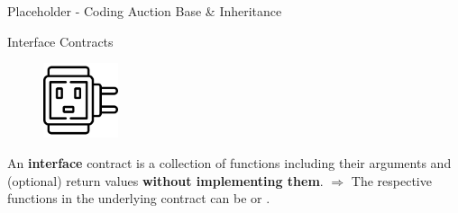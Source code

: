 \documentclass[handout]{beamer}
\begin{document}
\begin{frame}{Placeholder - Coding Auction Base \& Inheritance}

\end{frame}


\begin{frame}{Interface Contracts}

\begin{minipage}{0.3\textwidth}
	\begin{figure}
		\center
		\includegraphics[width= 2.2cm]{../assets/images/interface.png}	
	\end{figure}
\end{minipage}
\begin{minipage}{0.65\textwidth}
	\vspace{1em}
	An \textbf{interface} contract is a collection of  functions including their arguments and (optional) return values \textbf{without implementing them}.
		\vspace{0.5em}
$\Rightarrow$ The respective functions in the underlying contract can be  or .
\end{minipage}

\vspace{1.5em}


\end{frame}
\end{document}
